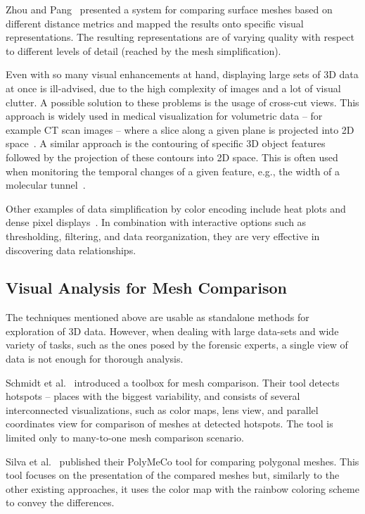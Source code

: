 \documentclass[final,5p,times]{elsarticle}
\begin{document}
Zhou and Pang~\cite{Zhou2001} presented a system for comparing surface meshes based on different distance metrics and mapped the results onto specific visual representations.
The resulting representations are of varying quality with respect to different levels of detail (reached by the mesh simplification).

Even with so many visual enhancements at hand, displaying large sets of 3D data at once is ill-advised, due to the high complexity of images and a lot of visual clutter. 
A possible solution to these problems is the usage of cross-cut views. 
This approach is widely used in medical visualization for volumetric data -- for example CT scan images -- where a slice along a given plane is projected into 2D space~\cite{friese2011yadiv}. 
A similar approach is the contouring of specific 3D object features followed by the projection of these contours into 2D space.
This is often used when monitoring the temporal changes of a given feature, e.g., the width of a molecular tunnel~\cite{byska}.

Other examples of data simplification by color encoding include heat plots and dense pixel displays~\cite{byska,ivanisiev,zhai}. 
In combination with interactive options such as thresholding, filtering, and data reorganization, they are very effective in discovering data relationships.

\subsection{Visual Analysis for Mesh Comparison}
The techniques mentioned above are usable as standalone methods for exploration of 3D data.
However, when dealing with large data-sets and wide variety of tasks, such as the ones posed by the forensic experts, a single view of data is not enough for thorough analysis.

Schmidt et al.~\cite{ymca} introduced a toolbox for mesh comparison.
Their tool detects hotspots -- places with the biggest variability, and consists of several interconnected visualizations, such as color maps, lens view, and parallel coordinates view for comparison of meshes at detected hotspots.
The tool is limited only to many-to-one mesh comparison scenario.

Silva et al.~\cite{Silva2005} published their PolyMeCo tool for comparing polygonal meshes. 
This tool focuses on the presentation of the compared meshes but, similarly to the other existing approaches, it uses the color map with the rainbow coloring scheme to convey the differences.
\end{document}

